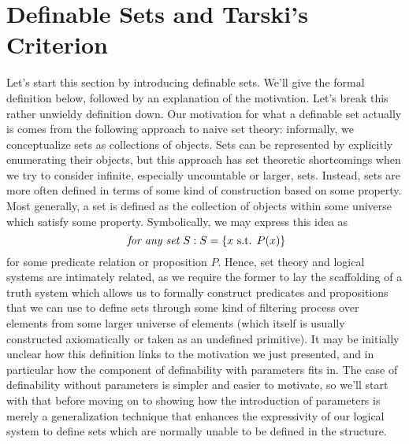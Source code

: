 \documentclass{article}
\begin{document}
\section{Definable Sets and Tarski's Criterion}
Let's start this section by introducing definable sets. We'll give the formal definition below, followed by an explanation of the motivation.
Let's break this rather unwieldy definition down. Our motivation for what a definable set actually is comes from the following approach to naive set theory: informally, we conceptualize sets as collections of objects. Sets can be represented by explicitly enumerating their objects, but this approach has set theoretic shortcomings when we try to consider infinite, especially uncountable or larger, sets. Instead, sets are more often defined in terms of some kind of construction based on some property. Most generally, a set is defined as the collection of objects within some universe which satisfy some property. Symbolically, we may express this idea as
    $$ \textit{ for any set $ S $}: S = \{ x \textnormal{ s.t. } P(x) \} $$
for some predicate relation or proposition $ P $. Hence, set theory and logical systems are intimately related, as we require the former to lay the scaffolding of a truth system which allows us to formally construct predicates and propositions that we can use to define sets through some kind of filtering process over elements from some larger universe of elements (which itself is usually constructed axiomatically or taken as an undefined primitive). It may be initially unclear how this definition links to the motivation we just presented, and in particular how the component of definability with parameters fits in. The case of definability without parameters is simpler and easier to motivate, so we'll start with that before moving on to showing how the introduction of parameters is merely a generalization technique that enhances the expressivity of our logical system to define sets which are normally unable to be defined in the structure.
\end{document}
